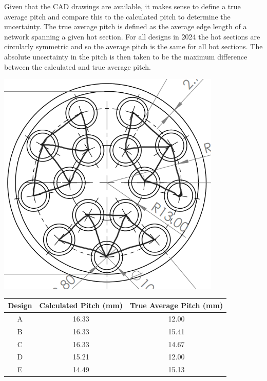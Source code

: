 \documentclass{article}
\begin{document}
Given that the CAD drawings are available, it makes sense to define a true average pitch and compare this to the calculated pitch to determine the uncertainty.
The true average pitch is defined as the average edge length of a network spanning a given hot section.
For all designs in 2024 the hot sections are circularly symmetric and so the average pitch is the same for all hot sections.
The absolute uncertainty in the pitch is then taken to be the maximum difference between the calculated and true average pitch.

\begin{minipage}[t]{0.29\textwidth}
    \centering
    \includegraphics[width=0.8\textwidth]{tube_network.png}
    \label{fig:tube_network}
\end{minipage}
\begin{minipage}[t]{0.69\textwidth}
    \centering
    \begin{tabular}{|c|c|c|}
        \hline
        Design & Calculated Pitch (mm) & True Average Pitch (mm) \\
        \hline
        A & 16.33 & 12.00 \\
        B & 16.33 & 15.41 \\
        C & 16.33 & 14.67 \\
        D & 15.21 & 12.00 \\
        E & 14.49 & 15.13 \\
        \hline
    \end{tabular}
    \label{tab:pitch_comparison}
\end{minipage}
\end{document}

